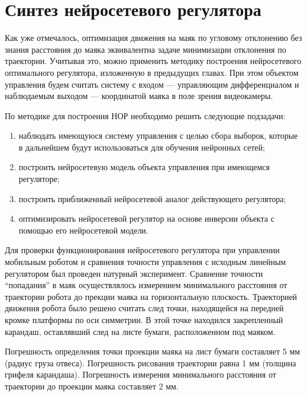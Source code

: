 \section{Синтез нейросетевого регулятора}

Как уже отмечалось, оптимизация движения на маяк по угловому
отклонению без знания расстояния до маяка эквивалентна задаче
минимизации отклонения по траектории.  Учитывая это, можно применить
методику построения нейросетевого оптимального регулятора, изложенную
в предыдущих главах.  При этом объектом управления будем считать
систему с входом --- управляющим дифференциалом и наблюдаемым выходом
--- координатой маяка в поле зрения видеокамеры.

По методике для построения НОР необходимо решить следующие подзадачи:
\begin{enumerate}

\item наблюдать имеющуюся систему управления с целью сбора выборок,
      которые в дальнейшем будут использоваться для обучения нейронных
      сетей;

\item построить нейросетевую модель объекта управления при имеющемся
      регуляторе;

\item построить приближенный нейросетевой аналог действующего регулятора;

\item оптимизировать нейросетевой регулятор на основе инверсии объекта
      с помощью его нейросетевой модели.

\end{enumerate}



Для проверки функционирования нейросетевого регулятора при управлении
мобильным роботом и сравнения точности управления с исходным линейным
регулятором был проведен натурный эксперимент.  Сравнение точности
``попадания'' в маяк осуществлялось измерением минимального расстояния
от траектории робота до прекции маяка на горизонтальную плоскость.
Траекторией движения робота было решено считать след точки,
находящейся на передней кромке платформы по оси симметрии.  В этой
точке находился закрепленный карандаш, оставлявший след на листе
бумаги, расположенном под маяком.

Погрешность определения точки проекции маяка на лист бумаги составляет
5 мм (радиус груза отвеса).  Погрешность рисования траектории равна 1
мм (толщина грифеля карандаша).  Погрешность измерения минимального
расстояния от траектории до проекции маяка составляет 2 мм.

